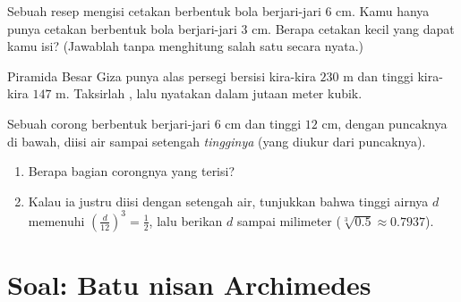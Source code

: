 \begin{exercise}[$\star\star$]\label{exo:g9:solids:7}
Sebuah resep mengisi cetakan berbentuk bola berjari-jari $6$ cm. Kamu
hanya punya cetakan berbentuk bola berjari-jari $3$ cm. Berapa cetakan
kecil yang dapat kamu isi? (Jawablah tanpa menghitung salah satu
 secara nyata.)
\end{exercise}

\begin{exercise}[$\star\star$]\label{exo:g9:solids:8}
Piramida Besar Giza punya alas persegi bersisi kira-kira $230$ m dan
tinggi kira-kira $147$ m. Taksirlah , lalu nyatakan dalam
jutaan meter kubik.
\end{exercise}

\begin{exercise}[$\star\star\star$]\label{exo:g9:solids:9}
Sebuah corong berbentuk  berjari-jari $6$ cm dan tinggi $12$ cm,
dengan puncaknya di bawah, diisi air sampai setengah \emph{tingginya}
(yang diukur dari puncaknya).
\begin{enumerate}
  \item Berapa bagian  corongnya yang terisi?
  \item Kalau ia justru diisi dengan setengah \emph{} air,
        tunjukkan bahwa tinggi airnya $d$ memenuhi
        $\left(\frac{d}{12}\right)^3 = \frac12$, lalu berikan $d$
        sampai milimeter ($\sqrt[3]{0.5} \approx 0.7937$).
\end{enumerate}
\end{exercise}

\section{Soal: Batu nisan Archimedes}

